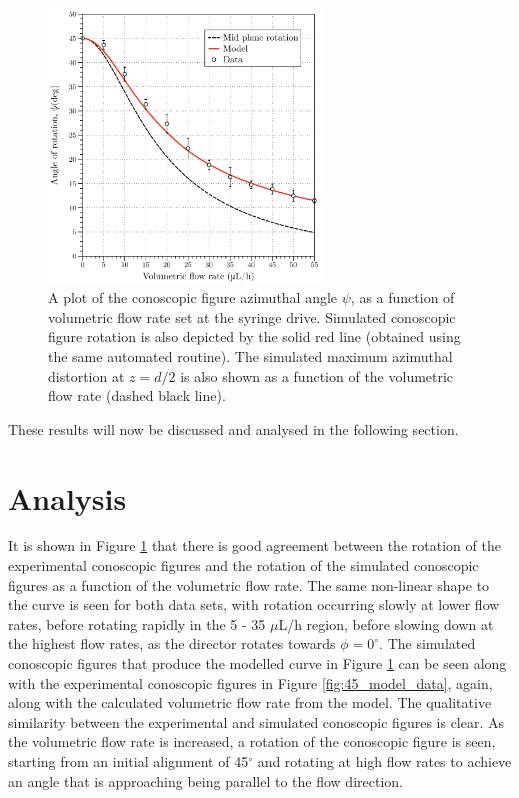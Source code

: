 \begin{figure}
\begin{center}
\includegraphics[width=0.65\textwidth]{Figures/45/45_data1}
\end{center}
\caption[Conoscopic figure rotation as a function of volumetric flow rate ($\phi_0=45^{\circ}$)]{\label{fig:45_data_plot}A plot of the conoscopic figure azimuthal angle $\psi$, as a function of volumetric flow rate set at the syringe drive. Simulated conoscopic figure rotation is also depicted by the solid red line (obtained using the same automated routine). The simulated maximum azimuthal distortion at $z=d/2$ is also shown as a function of the volumetric flow rate (dashed black line).}
\end{figure}

These results will now be discussed and analysed in the following section.

\section{Analysis}
\label{sec:analysis}
It is shown in Figure \ref{fig:45_data_plot} that there is good agreement between the rotation of the experimental conoscopic figures and the rotation of the simulated conoscopic figures as a function of the volumetric flow rate. The same non-linear shape to the curve is seen for both data sets, with rotation occurring slowly at lower flow rates, before rotating rapidly in the 5 - 35 $\mu$L/h region, before slowing down at the highest flow rates, as the director rotates towards $\phi=0^{\circ}$. The simulated conoscopic figures that produce the modelled curve in Figure \ref{fig:45_data_plot} can be seen along with the experimental conoscopic figures in Figure \ref{fig:45_model_data}, again, along with the calculated volumetric flow rate from the model. The qualitative similarity between the experimental and simulated conoscopic figures is clear. As the volumetric flow rate is increased, a rotation of the conoscopic figure is seen, starting from an initial alignment of 45$^{\circ}$ and rotating at high flow rates to achieve an angle that is approaching being parallel to the flow direction.

